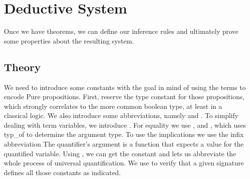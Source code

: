 \chapter{Deductive System}\label{chapter:predicate}

Once we have theorems, we can define our inference rules and ultimately prove some properties about the resulting system.

\section{Theory}

We need to introduce some constants with the goal in mind of using the terms to encode Pure propositions.
First, reserve the type constant  for those propositions, which strongly correlates to the more common boolean type, at least in a classical logic.
We also introduce some abbreviations, namely  and .
To simplify dealing with term variables, we introduce .
For equality we  use , and , which uses typ\_of to determine the argument type.
To use the implications we use the infix abbreviation 
The quantifier's argument is a function that expects a value for the quantified variable.
Using , we can get the constant and  lets us abbreviate the whole process of universal quantification.
We use  to verify that a given signature defines all those constants as indicated.

